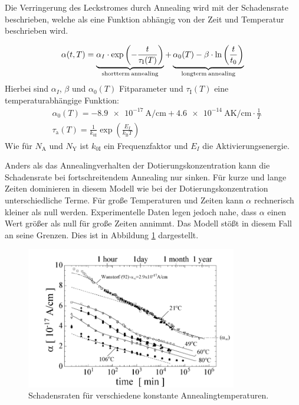 Die Verringerung des Leckstromes durch Annealing wird mit der Schadensrate
beschrieben, welche als eine Funktion abhängig von der Zeit und
Temperatur beschrieben wird.\cite{moll}

\begin{align}
  \alpha(t, T) = \underbrace{\alpha_I \cdot \exp{\left(-\frac{t}{\tau_{\mathrm{I}}(T)}\right)}}_{\mathrm{shortterm \: annealing}} + \underbrace{\alpha_{\mathrm{0}}(T) -\beta \cdot \ln{\left(\frac{t}{t_{\mathrm{0}}}\right)}}_{\mathrm{longterm \: annealing}} \text{\label{eqn:damage}}
\end{align}
Hierbei sind $\alpha_I$, $\beta$ und $\alpha_{\mathrm{0}}(T)$ Fitparameter und $\tau_{\mathrm{I}}(T)$ eine
temperaturabhängige Funktion:
\begin{align}
  &\alpha_{\mathrm{0}}(T) = \SI{-8.9e-17}{\ampere\per\centi\meter} + \SI{4.6e-14}{\ampere\kelvin\per\centi\meter} \cdot \frac{1}{T} \\
  &\tau_{\mathrm{a}}(T) = \frac{1}{k_{0\mathrm{I}}}\exp{\left(\frac{E_{I}}{k_{\mathrm{B}}T}\right)}
\end{align}
Wie für $N_{\mathrm{A}}$ und $N_{\mathrm{Y}}$ ist $k_{0\mathrm{I}}$ ein Frequenzfaktor und $E_{I}$ die Aktivierungsenergie.

Anders als das Annealingverhalten der Dotierungskonzentration kann die Schadensrate
bei fortschreitendem Annealing nur sinken. Für kurze und
lange Zeiten dominieren in diesem Modell wie bei der Dotierungskonzentration unterschiedliche
Terme. Für große Temperaturen und Zeiten kann $\alpha$ rechnerisch kleiner als null werden.
Experimentelle Daten legen jedoch nahe, dass $\alpha$ einen Wert größer als null für große Zeiten annimmt.
Das Modell stößt in diesem Fall
an seine Grenzen.
Dies ist in Abbildung \ref{fig:damage_rates} dargestellt.

\begin{figure}
  \centering
  \includegraphics[width=0.82\textwidth]{logos/schadensraten.PNG}
  \caption{Schadensraten für verschiedene konstante Annealingtemperaturen.\cite{moll}}
  \label{fig:damage_rates}
\end{figure}
